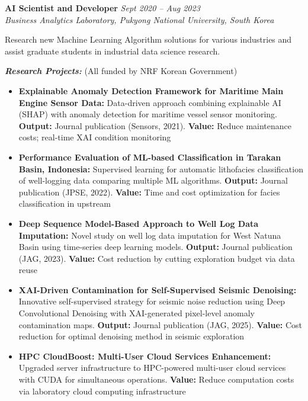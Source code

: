 \documentclass[10pt,a4paper]{article}
\newcommand{\experience}[4]{%
    \noindent\textbf{#1} \hfill \textit{#2}\\
    \textit{#3} \hfill #4\vspace{2pt}
}
\begin{document}
\vspace{4pt}

\experience{AI Scientist and Developer}{Sept 2020 -- Aug 2023}{Business Analytics Laboratory, Pukyong National University, South Korea}{}
Research new Machine Learning Algorithm solutions for various industries and assist graduate students in industrial data science research.

\textit{\textbf{Research Projects:}} (All funded by NRF Korean Government)
\begin{itemize}
    \item \textbf{Explainable Anomaly Detection Framework for Maritime Main Engine Sensor Data:} Data-driven approach combining explainable AI (SHAP) with anomaly detection for maritime vessel sensor monitoring. \textcolor{accent}{\textbf{Output:}} Journal publication (Sensors, 2021). \textcolor{accent}{\textbf{Value:}} Reduce maintenance costs; real-time XAI condition monitoring
    \item \textbf{Performance Evaluation of ML-based Classification in Tarakan Basin, Indonesia:} Supervised learning for automatic lithofacies classification of well-logging data comparing multiple ML algorithms. \textcolor{accent}{\textbf{Output:}} Journal publication (JPSE, 2022). \textcolor{accent}{\textbf{Value:}} Time and cost optimization for facies classification in upstream
    \item \textbf{Deep Sequence Model-Based Approach to Well Log Data Imputation:} Novel study on well log data imputation for West Natuna Basin using time-series deep learning models. \textcolor{accent}{\textbf{Output:}} Journal publication (JAG, 2023). \textcolor{accent}{\textbf{Value:}} Cost reduction by cutting exploration budget via data reuse
    \item \textbf{XAI-Driven Contamination for Self-Supervised Seismic Denoising:} Innovative self-supervised strategy for seismic noise reduction using Deep Convolutional Denoising with XAI-generated pixel-level anomaly contamination maps. \textcolor{accent}{\textbf{Output:}} Journal publication (JAG, 2025). \textcolor{accent}{\textbf{Value:}} Cost reduction for optimal denoising method in seismic exploration
    \item \textbf{HPC CloudBoost: Multi-User Cloud Services Enhancement:} Upgraded server infrastructure to HPC-powered multi-user cloud services with CUDA for simultaneous operations. \textcolor{accent}{\textbf{Value:}} Reduce computation costs via laboratory cloud computing infrastructure
\end{itemize}
\end{document}
